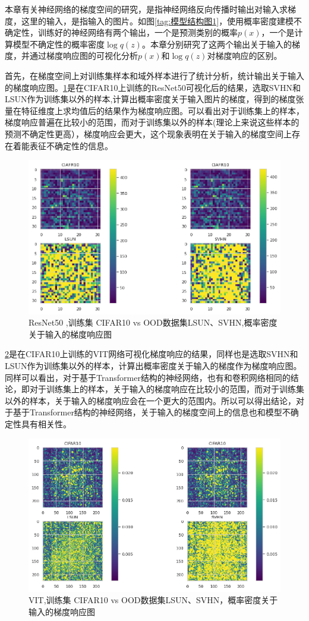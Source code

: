 本章有关神经网络的梯度空间的研究，是指神经网络反向传播时输出对输入求梯度，这里的输入，是指输入的图片。如图\ref{tag:模型结构图1}，使用概率密度建模不确定性，训练好的神经网络有两个输出，一个是预测类别的概率$p(x)$，一个是计算模型不确定性的概率密度$\log q(z)$。本章分别研究了这两个输出关于输入的梯度，并通过梯度响应图的可视化分析$p(x)$和$\log q(z)$对梯度响应的区别。

首先，在梯度空间上对训练集样本和域外样本进行了统计分析，统计输出关于输入的梯度响应图。\ref{fig:resp1}是在CIFAR10上训练的ResNet50可视化后的结果，选取SVHN和LSUN作为训练集以外的样本,计算出概率密度关于输入图片的梯度，得到的梯度张量在特征维度上求均值后的结果作为梯度响应图。可以看出对于训练集上的样本，梯度响应普遍在比较小的范围，而对于训练集以外的样本(理论上来说这些样本的预测不确定性更高），梯度响应会更大，这个现象表明在关于输入的梯度空间上存在着能表征不确定性的信息。
\begin{figure}[h]
    \captionsetup{font=small, justification=centering}
    \centering
    \includegraphics[width=0.75\linewidth]{assets/3-1.png}
    \caption{ResNet50 ,训练集 CIFAR10 vs OOD数据集LSUN、SVHN,概率密度关于输入的梯度响应图
}
    \label{fig:resp1}
\end{figure}

\ref{fig:resp2}是在CIFAR10上训练的VIT网络可视化梯度响应的结果，同样也是选取SVHN和LSUN作为训练集以外的样本，计算出概率密度关于输入的梯度作为梯度响应图。同样可以看出，对于基于Transformer\cite{vaswani2017attention}结构的神经网络，也有和卷积网络相同的结论，即对于训练集上的样本，关于输入的梯度响应在比较小的范围，而对于训练集以外的样本，关于输入的梯度响应会在一个更大的范围内。所以可以得出结论，对于基于Transformer结构的神经网络，关于输入的梯度空间上的信息也和模型不确定性具有相关性。
\begin{figure}[h]
    \captionsetup{font=small, justification=centering}
    \centering
    \includegraphics[width=0.75\linewidth]{assets/3-2.png}
    \caption{VIT,训练集 CIFAR10 vs OOD数据集LSUN、SVHN，概率密度关于输入的梯度响应图
}
    \label{fig:resp2}
\end{figure}

